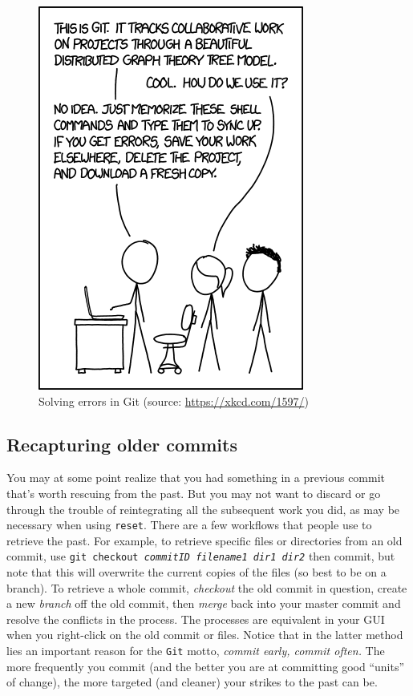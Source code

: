 \documentclass[12pt,letterpaper]{article}
\begin{document}
\begin{figure}[h]
	\centering
	\includegraphics[width=0.5\linewidth]{figs/gitreset.png}
	\caption{Solving errors in Git (source: \url{https://xkcd.com/1597/})}
	\label{fig:gitreset}
\end{figure}



\subsection{Recapturing older commits}
You may at some point realize that you had something in a previous commit 
that's worth rescuing from the past. 
But you may not want to discard or go through the trouble of reintegrating all 
the subsequent work you did, as may be necessary when using \texttt{reset}.
There are a few workflows that people use to retrieve the past.
For example, to retrieve specific files or directories from an old commit, 
use \texttt{git checkout \emph{commitID} \emph{filename1} \emph{dir1} 
\emph{dir2}} then commit, 
but note that this will overwrite the current copies of the files
(so best to be on a branch).
To retrieve a whole commit, \emph{checkout} the old commit in question, 
create a new \emph{branch} off the old commit, 
then \emph{merge} back into your master commit and resolve the conflicts in 
the process.
The processes are equivalent in your GUI when you right-click on the old 
commit or files.
Notice that in the latter method lies an important reason for the \texttt{Git} motto, \emph{commit early, commit often.}
The more frequently you commit
(and the better you are at committing good ``units'' of change), 
the more targeted (and cleaner) your strikes to the past can be.
\end{document}
